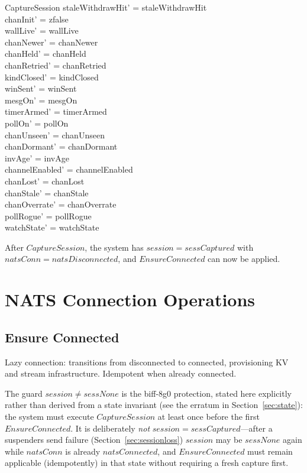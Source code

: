 \documentclass[a4paper,10pt,fleqn]{article}
\begin{document}
\begin{schema}{CaptureSession}
  staleWithdrawHit' = staleWithdrawHit \\
  chanInit' = zfalse \\
  wallLive' = wallLive \\
  chanNewer' = chanNewer \\
  chanHeld' = chanHeld \\
  chanRetried' = chanRetried \\
  kindClosed' = kindClosed \\
  winSent' = winSent \\
  mesgOn' = mesgOn \\
  timerArmed' = timerArmed \\
  pollOn' = pollOn \\
  chanUnseen' = chanUnseen \\
  chanDormant' = chanDormant \\
  invAge' = invAge \\
  channelEnabled' = channelEnabled \\
  chanLost' = chanLost \\
  chanStale' = chanStale \\
  chanOverrate' = chanOverrate \\
  pollRogue' = pollRogue \\
  watchState' = watchState
\end{schema}

After $CaptureSession$, the system has $session = sessCaptured$
with $natsConn = natsDisconnected$, and $EnsureConnected$ can now be
applied.

\section{NATS Connection Operations}

\subsection{Ensure Connected}
\label{sec:ensureconnected}

Lazy connection: transitions from disconnected to connected,
provisioning KV and stream infrastructure.  Idempotent when
already connected.

The guard $session \neq sessNone$ is the biff-8g0 protection, stated
here explicitly rather than derived from a state invariant (see the
erratum in Section~\ref{sec:state}): the system must execute
$CaptureSession$ at least once before the first $EnsureConnected$.
It is deliberately \emph{not} $session = sessCaptured$---after a
suspenders send failure (Section~\ref{sec:sessionloss}) $session$ may
be $sessNone$ again while $natsConn$ is already $natsConnected$, and
$EnsureConnected$ must remain applicable (idempotently) in that state
without requiring a fresh capture first.
\end{document}

